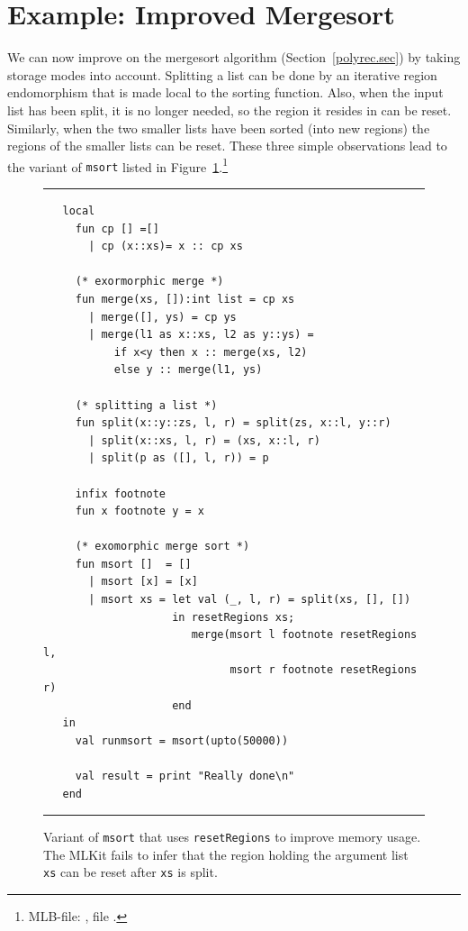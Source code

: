 \documentclass[12pt]{book}
\begin{document}
\section{Example: Improved Mergesort}
\label{improvedmerge.sec}
We can now improve on the 
%
%
mergesort algorithm (Section~\ref{polyrec.sec}) by taking storage
modes into account. Splitting a list can be done by an iterative
region endomorphism that is made local to the sorting function.  Also,
when the input list has been split, it is no longer needed, so the
region it resides in can be reset. Similarly, when the two smaller
lists have been sorted (into new regions) the regions of the smaller
lists can be reset. These three simple observations lead to the
variant of {\tt msort} listed in
Figure~\ref{msortreset1.fig}.\footnote{MLB-file:
  , file
  .}
\begin{figure}
\hrule
\medskip
\begin{verbatim}
   local
     fun cp [] =[]
       | cp (x::xs)= x :: cp xs

     (* exormorphic merge *)
     fun merge(xs, []):int list = cp xs
       | merge([], ys) = cp ys
       | merge(l1 as x::xs, l2 as y::ys) = 
           if x<y then x :: merge(xs, l2) 
           else y :: merge(l1, ys)

     (* splitting a list *)
     fun split(x::y::zs, l, r) = split(zs, x::l, y::r)
       | split(x::xs, l, r) = (xs, x::l, r)
       | split(p as ([], l, r)) = p

     infix footnote
     fun x footnote y = x

     (* exomorphic merge sort *)
     fun msort []  = []
       | msort [x] = [x]
       | msort xs = let val (_, l, r) = split(xs, [], [])
                    in resetRegions xs;
                       merge(msort l footnote resetRegions l, 
                             msort r footnote resetRegions r)
                    end
   in
     val runmsort = msort(upto(50000))

     val result = print "Really done\n"
   end
\end{verbatim}
\caption{Variant of {\tt msort} that uses {\tt resetRegions} to improve 
  memory usage. The MLKit fails to infer that the region holding the
  argument list {\tt xs} can be reset after {\tt xs} is split.}
\label{msortreset1.fig}
\medskip \hrule
\end{figure}
\end{document}
